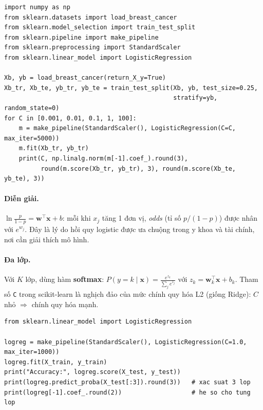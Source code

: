 \begin{lstlisting}[caption={Đường chính quy hóa của hồi quy logistic}]
import numpy as np
from sklearn.datasets import load_breast_cancer
from sklearn.model_selection import train_test_split
from sklearn.pipeline import make_pipeline
from sklearn.preprocessing import StandardScaler
from sklearn.linear_model import LogisticRegression

Xb, yb = load_breast_cancer(return_X_y=True)
Xb_tr, Xb_te, yb_tr, yb_te = train_test_split(Xb, yb, test_size=0.25,
                                              stratify=yb, random_state=0)
for C in [0.001, 0.01, 0.1, 1, 100]:
    m = make_pipeline(StandardScaler(), LogisticRegression(C=C, max_iter=5000))
    m.fit(Xb_tr, yb_tr)
    print(C, np.linalg.norm(m[-1].coef_).round(3),
          round(m.score(Xb_tr, yb_tr), 3), round(m.score(Xb_te, yb_te), 3))
\end{lstlisting}

\paragraph{Diễn giải.} $\ln\frac{p}{1-p} = \mathbf{w}^\top\mathbf{x} + b$: mỗi khi $x_j$ tăng 1 đơn vị, \textit{odds} (tỉ số $p/(1-p)$) được nhân với $e^{w_j}$. Đây là lý do hồi quy logistic được ưa chuộng trong y khoa và tài chính, nơi cần giải thích mô hình.

\paragraph{Đa lớp.} Với $K$ lớp, dùng hàm \textbf{softmax}: $P(y = k \mid \mathbf{x}) = \frac{e^{z_k}}{\sum_{j} e^{z_j}}$ với $z_k = \mathbf{w}_k^\top\mathbf{x} + b_k$. Tham số \texttt{C} trong scikit-learn là nghịch đảo của mức chính quy hóa L2 (giống Ridge): $C$ nhỏ $\Rightarrow$ chính quy hóa mạnh.

\begin{lstlisting}[caption={Logistic Regression với scikit-learn}]
from sklearn.linear_model import LogisticRegression

logreg = make_pipeline(StandardScaler(), LogisticRegression(C=1.0, max_iter=1000))
logreg.fit(X_train, y_train)
print("Accuracy:", logreg.score(X_test, y_test))
print(logreg.predict_proba(X_test[:3]).round(3))   # xac suat 3 lop
print(logreg[-1].coef_.round(2))                   # he so cho tung lop
\end{lstlisting}


